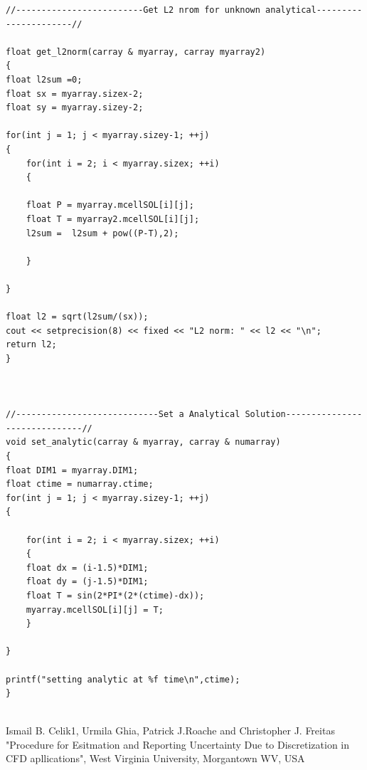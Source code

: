 \documentclass[paper=a4, fontsize=11pt, abstract=on]{scrartcl}
\numberwithin{equation}{section}		%
\numberwithin{figure}{section}			%
\numberwithin{table}{section}				%
\begin{document}
\begin{lstlisting}
//-------------------------Get L2 nrom for unknown analytical----------------------//

float get_l2norm(carray & myarray, carray myarray2)
{
float l2sum =0;
float sx = myarray.sizex-2;
float sy = myarray.sizey-2;

for(int j = 1; j < myarray.sizey-1; ++j)
{	
	for(int i = 2; i < myarray.sizex; ++i)
	{

	float P = myarray.mcellSOL[i][j];
	float T = myarray2.mcellSOL[i][j];
	l2sum =  l2sum + pow((P-T),2);

	}

}

float l2 = sqrt(l2sum/(sx));
cout << setprecision(8) << fixed << "L2 norm: " << l2 << "\n";
return l2;
}



//----------------------------Set a Analytical Solution------------------------------//
void set_analytic(carray & myarray, carray & numarray)
{
float DIM1 = myarray.DIM1;
float ctime = numarray.ctime;
for(int j = 1; j < myarray.sizey-1; ++j)
{

	for(int i = 2; i < myarray.sizex; ++i)
	{
	float dx = (i-1.5)*DIM1;
	float dy = (j-1.5)*DIM1;
	float T = sin(2*PI*(2*(ctime)-dx));
	myarray.mcellSOL[i][j] = T;
	}

}

printf("setting analytic at %f time\n",ctime);
}


\end{lstlisting}

\begin{thebibliography}{99} %
Ismail B. Celik1, Urmila Ghia, Patrick J.Roache and Christopher J. Freitas
\newblock "Procedure for Esitmation and Reporting Uncertainty Due to Discretization in CFD apllications",  West Virginia University, Morgantown WV, USA

\end{thebibliography}


\end{document}
